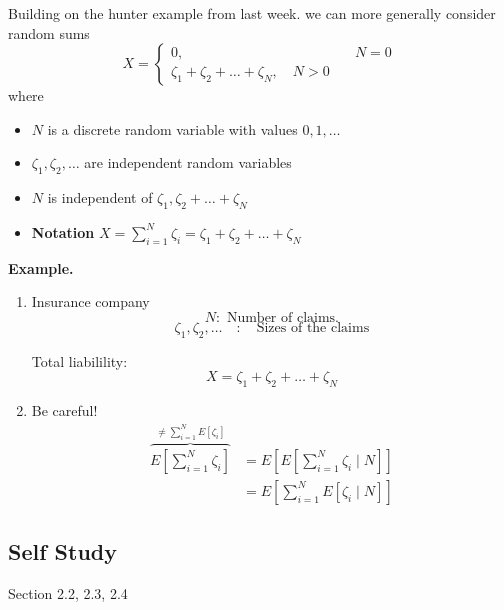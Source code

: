 \documentclass{article}
\theoremstyle{remark}
\begin{document}
Building on the hunter example from last week. we can more generally consider random sums \[
  X = \begin{cases}
    0,  &  \quad  N = 0 \\
    \zeta_{1} + \zeta _{2} + \ldots + \zeta_N , \quad  N >0  
  \end{cases}
\] 
where 
\begin{itemize}
  \item $N$ is a discrete random variable with values $0,1, \ldots$ 
  \item $\zeta _{1}, \zeta _{2}, \ldots $ are independent random variables
  \item $N$ is independent of $\zeta _{1}, \zeta _{2} + \ldots + \zeta _{N}$ 
  \item \textbf{Notation}  $X = \sum_{i=1}^{N} \zeta _{i} = \zeta _{1} + \zeta _{2} + \ldots + \zeta _{N}$ 
\end{itemize}

\begin{tcolorbox}
  \textbf{Example.} 
  \begin{enumerate}
    \item Insurance company \[
    N: \text{ Number of claims.} 
    \] 
  \[
    \zeta _{1} , \zeta _{2} , \ldots \quad  : \quad \text{Sizes of the claims} 
  \] 

  Total liabilility: \[
  X = \zeta _{1}+ \zeta _{2} + \ldots + \zeta _{N}
  \] 
\item  Be careful! \[
    \begin{split}
      \overbrace{E\left[ \sum_{i=1}^{N} \zeta _{i} \right]}^{\neq \sum_{i=1}^{N} E\left[ \zeta _{i} \right]}   & = E\left[ E\left[ \sum_{i=1}^{N} \zeta _{i}  \mid N \right] \right]\\
&= E\left[ \sum_{i=1}^{N} E\left[ \zeta _{i}  \mid  N \right] \right] 
    \end{split} 
\] 
  \end{enumerate}
\end{tcolorbox}

\subsection{Self Study}%
\label{sub:self_study}

Section 2.2, 2.3, 2.4
\end{document}
